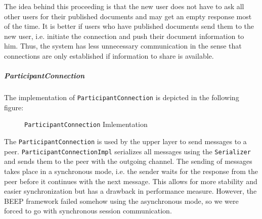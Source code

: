 The idea behind this proceeding is that the new user does not have to ask all other users for their published documents and may get an empty response most of the time. It is better if users who have published documents send them to the new user, i.e. initiate the connection and push their document information to him. Thus, the system has less unnecessary communication in the sense that connections are only established if information to share is available.

\subparagraph{ParticipantConnection}
The implementation of \texttt{ParticipantConnection} is depicted in the following figure:

\begin{figure}[H]
 \centering
 \caption{\texttt{ParticipantConnection} Imlementation}
 \label{fig:network.protocol.participantconnectionimpl.uml}
\end{figure}

The \texttt{ParticipantConnection} is used by the upper layer to send messages to a peer. \texttt{Participant\-Connection\-Impl} serializes all messages using the \texttt{Serializer} and sends them to the peer with the outgoing channel. The sending of messages takes place in a synchronous mode, i.e. the sender waits for the response from the peer before it continues with the next message. This allows for more stability and easier synchronization but has a drawback in performance measure. However, the BEEP framework failed somehow using the asynchronous mode, so we were forced to go with synchronous session communication.

